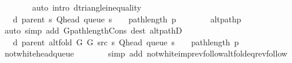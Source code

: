 \begin{isabellebody}
\ \ \ \ \ \ \isamarkupfalse%
\ {\isacharparenleft}{\kern0pt}auto\ intro{\isacharcolon}{\kern0pt}\ d{\isacharunderscore}{\kern0pt}triangle{\isacharunderscore}{\kern0pt}inequality{\isacharparenright}{\kern0pt}\isanewline
\ \ \ \ \isamarkupfalse%
\ \isamarkupfalse%
\ {\isachardoublequoteopen}{\isachardot}{\kern0pt}{\isachardot}{\kern0pt}{\isachardot}{\kern0pt}\ {\isacharequal}{\kern0pt}\ d\ {\isacharparenleft}{\kern0pt}parent\ s{\isacharparenright}{\kern0pt}\ {\isacharparenleft}{\kern0pt}Q{\isacharunderscore}{\kern0pt}head\ {\isacharparenleft}{\kern0pt}queue\ s{\isacharparenright}{\kern0pt}{\isacharparenright}{\kern0pt}\ {\isacharplus}{\kern0pt}\ {}\ {\isacharplus}{\kern0pt}\ path{\isacharunderscore}{\kern0pt}length\ p{\isachardoublequoteclose}\isanewline
\ \ \ \ \ \ \isamarkupfalse%
\ alt{\isacharunderscore}{\kern0pt}path{\isacharunderscore}{\kern0pt}p\isanewline
\ \ \ \ \ \ \isamarkupfalse%
\ {\isacharparenleft}{\kern0pt}auto\ simp\ add{\isacharcolon}{\kern0pt}\ G{\isachardot}{\kern0pt}path{\isacharunderscore}{\kern0pt}length{\isacharunderscore}{\kern0pt}Cons\ dest{\isacharcolon}{\kern0pt}\ alt{\isacharunderscore}{\kern0pt}pathD{\isacharparenleft}{\kern0pt}{}{\isacharparenright}{\kern0pt}{\isacharparenright}{\kern0pt}\isanewline
\ \ \ \ \isamarkupfalse%
\ \isamarkupfalse%
\ {\isachardoublequoteopen}{\isachardot}{\kern0pt}{\isachardot}{\kern0pt}{\isachardot}{\kern0pt}\ {\isacharequal}{\kern0pt}\ d\ {\isacharparenleft}{\kern0pt}parent\ {\isacharparenleft}{\kern0pt}alt{\isacharunderscore}{\kern0pt}fold\ G{}\ G{}\ src\ s{\isacharparenright}{\kern0pt}{\isacharparenright}{\kern0pt}\ {\isacharparenleft}{\kern0pt}Q{\isacharunderscore}{\kern0pt}head\ {\isacharparenleft}{\kern0pt}queue\ s{\isacharparenright}{\kern0pt}{\isacharparenright}{\kern0pt}\ {\isacharplus}{\kern0pt}\ {}\ {\isacharplus}{\kern0pt}\ path{\isacharunderscore}{\kern0pt}length\ p{\isachardoublequoteclose}\isanewline
\ \ \ \ \ \ \isamarkupfalse%
\ not{\isacharunderscore}{\kern0pt}white{\isacharunderscore}{\kern0pt}head{\isacharunderscore}{\kern0pt}queue\isanewline
\ \ \ \ \ \ \isamarkupfalse%
\ {\isacharparenleft}{\kern0pt}simp\ add{\isacharcolon}{\kern0pt}\ not{\isacharunderscore}{\kern0pt}white{\isacharunderscore}{\kern0pt}imp{\isacharunderscore}{\kern0pt}rev{\isacharunderscore}{\kern0pt}follow{\isacharunderscore}{\kern0pt}alt{\isacharunderscore}{\kern0pt}fold{\isacharunderscore}{\kern0pt}eq{\isacharunderscore}{\kern0pt}rev{\isacharunderscore}{\kern0pt}follow{\isacharparenright}{\kern0pt}\isanewline

\end{isabellebody}
